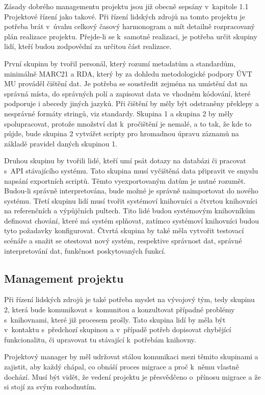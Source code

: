 \documentclass[
	11pt, oneside, printed, draft, 
	table,   %
	lof,     %
	lot     %
]{fithesis3}
\begin{document}
{Zásady dobrého managementu projektu jsou již obecně sepsány v~kapitole 1.1 Projektové řízení jako takové. Při řízení lidských zdrojů na tomto projektu je potřeba brát v~úvahu celkový časový harmonogram a mít detailně rozpracovaný plán realizace projektu. Přejde-li se k~samotné realizaci, je potřeba určit skupiny lidí, kteří budou zodpovědní za určitou část realizace.  %

První skupinu by tvořil personál, který rozumí metadatům a standardům, minimálně MARC21 a RDA, který by za dohledu metodologické podpory ÚVT MU prováděl čištění dat. Je potřeba se soustředit zejména na umístění dat na správná místa, do správných polí a zapisovat data ve vhodném kódování, které podporuje i abecedy jiných jazyků. Při čištění by měly být odstraněny překlepy a nesprávné formáty stringů, viz standardy. Skupina 1 a skupina 2 by měly spolupracovat, protože množství dat k~pročištění je nemalé, a to tak, že kde to půjde, bude skupina 2 vytvářet scripty pro hromadnou úpravu záznamů na základě pravidel daných skupinou 1.

Druhou skupinu by tvořili lidé, kteří umí psát dotazy na databázi či pracovat s~API stávajícího systému. Tato skupina musí vyčištěná data připravit ve smyslu napsání exportních scriptů. Těmto vyexportovaným datům je nutné  rozumět. Budou-li správně interpretována, bude možné je správně naimportovat do nového systému.
Třetí skupinu lidí musí tvořit systémoví knihovníci a čtvrtou knihovníci na referenčních a výpůjčních pultech. Tito lidé budou systémovým knihovníkům definovat chování, které má systém splňovat, zatímco systémoví knihovníci budou tyto požadavky konfigurovat. Čtvrtá skupina by také měla vytvořit testovací scénáře a snažit se otestovat nový systém, respektive správnost dat, správné interpretování dat, funkčnost poskytovaných funkcí.

\subsection{Management projektu}
Při řízení lidských zdrojů je také potřeba myslet na vývojový tým, tedy skupinu 2, která bude komunikovat s~komunitou a konzultovat případné problémy s~knihovnami, které již procesem prošly. Tato skupina lidí by měla být v~kontaktu s~předchozí skupinou a v~případě potřeb dopisovat chybějící funkcionalitu, či upravovat tu stávající k~potřebám knihovny.

Projektový manager by měl udržovat stálou komunikaci mezi těmito skupinami a zajistit, aby každý chápal, co obnáší proces migrace a proč k~němu vlastně dochází. Musí být vidět, že vedení projektu je přesvědčeno o~přínosu migrace a že si stojí za svým rozhodnutím. 

}
\end{document}

